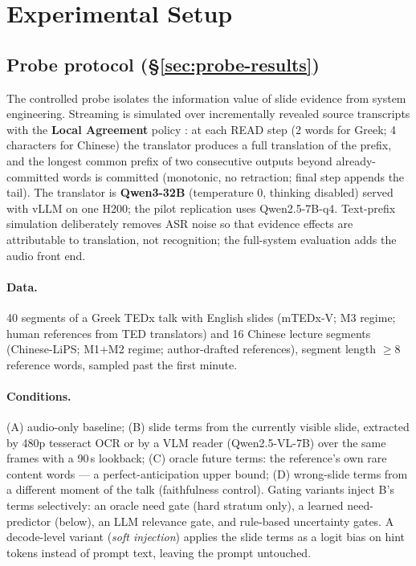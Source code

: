 \section{Experimental Setup}
\label{sec:experiments}

\subsection{Probe protocol (\S\ref{sec:probe-results})}

The controlled probe isolates the information value of slide evidence from
system engineering. Streaming is simulated over incrementally revealed source
transcripts with the \textbf{Local Agreement} policy \citep{liu2020lowlatency}:
at each READ step (2 words for Greek; 4 characters for Chinese) the translator
produces a full translation of the prefix, and the longest common prefix of two
consecutive outputs beyond already-committed words is committed (monotonic, no
retraction; final step appends the tail). The translator is
\textbf{Qwen3-32B} (temperature 0, thinking disabled) served with vLLM on one
H200; the pilot replication uses Qwen2.5-7B-q4. Text-prefix simulation
deliberately removes ASR noise so that evidence effects are attributable to
translation, not recognition; the full-system evaluation adds the audio front
end.

\paragraph{Data.} 40 segments of a Greek TEDx talk with English slides
(mTEDx-V; M3 regime; human references from TED translators) and 16 Chinese
lecture segments (Chinese-LiPS; M1+M2 regime; author-drafted references),
segment length $\geq 8$ reference words, sampled past the first minute.

\paragraph{Conditions.} (A) audio-only baseline; (B) slide terms from the
currently visible slide, extracted by 480p tesseract OCR or by a VLM reader
(Qwen2.5-VL-7B) over the same frames with a 90\,s lookback; (C) oracle future
terms: the reference's own rare content words --- a perfect-anticipation upper
bound; (D) wrong-slide terms from a different moment of the talk (faithfulness
control). Gating variants inject B's terms selectively: an oracle need gate
(hard stratum only), a learned need-predictor (below), an LLM relevance gate,
and rule-based uncertainty gates. A decode-level variant (\emph{soft
injection}) applies the slide terms as a logit bias on hint tokens instead of
prompt text, leaving the prompt untouched.

